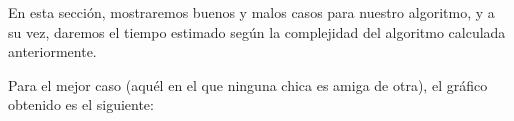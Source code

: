 \indent En esta secci\'on, mostraremos buenos y malos casos para nuestro algoritmo, y a su vez, daremos el tiempo estimado 
seg\'un la complejidad del algoritmo calculada anteriormente.

Para el mejor caso (aqu\'el en el que ninguna chica es amiga de otra), el gr\'afico obtenido es el siguiente:

\vspace*{0.3cm} \vspace*{0.3cm}
  \begin{center}
  \end{center}
  \vspace*{0.3cm}

